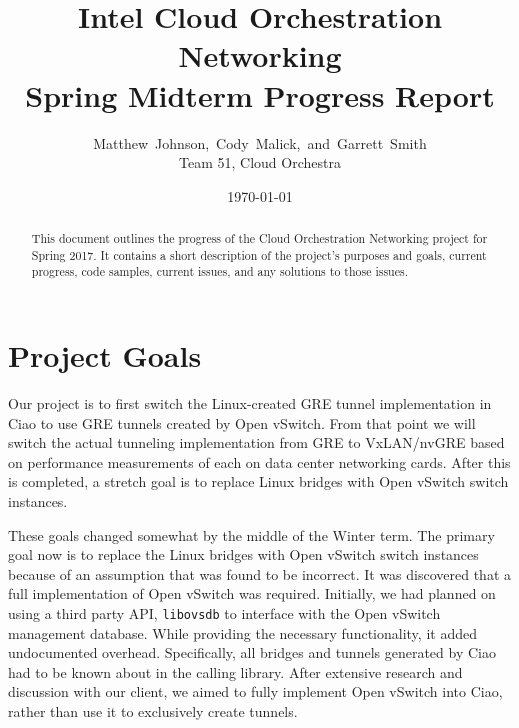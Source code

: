 \documentclass[10pt,onecolumn,journal,draftclsnofoot]{IEEEtran}
\begin{document}
\begin{titlepage}
	\title{Intel Cloud Orchestration Networking\\ Spring Midterm Progress Report}
	\author{Matthew~Johnson,~Cody~Malick,~and~Garrett~Smith\\
		Team 51, Cloud Orchestra}
	\date{\today}
	\maketitle
	\vspace{4cm}
	\begin{abstract}
		\noindent This document outlines the progress of the Cloud
		Orchestration Networking project for Spring 2017. It contains
		a short description of the project's purposes
		and goals, current progress, code samples, current issues,
		and any solutions to those issues. \end{abstract}

\end{titlepage}
\tableofcontents
\clearpage

\section{Project Goals}

Our project is to first switch the Linux-created GRE tunnel implementation in
Ciao to use GRE tunnels created by Open vSwitch. From that point we will switch
the actual tunneling implementation from GRE to VxLAN/nvGRE based on performance
measurements of each on data center networking cards. After this is completed, a
stretch goal is to replace Linux bridges with Open vSwitch switch instances.

These goals changed somewhat by the middle of the Winter term. The primary goal
now is to replace the Linux bridges with Open vSwitch switch instances because
of an assumption that was found to be incorrect. It was discovered that a full
implementation of Open vSwitch was required. Initially, we had planned on using
a third party API, \texttt{libovsdb} to interface with the Open vSwitch management
database.\cite{libovsdb} While providing the necessary functionality, it added undocumented
overhead. Specifically, all bridges and tunnels generated by Ciao had to be known
about in the calling library. After extensive research and discussion with our
client, we aimed to fully implement Open vSwitch into Ciao, rather than use it
to exclusively create tunnels. 
\end{document}

